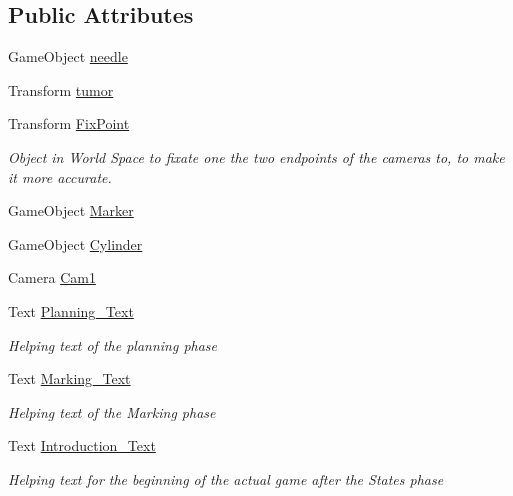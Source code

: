 \subsection*{Public Attributes}
\begin{DoxyCompactItemize}
\item 
Game\+Object \mbox{\hyperlink{class_states_by_switch_ac45169b7b1eeeeec3983d4c9109fb144}{needle}}
\item 
Transform \mbox{\hyperlink{class_states_by_switch_a22ee2b11d00f659a78da32cec049de22}{tumor}}
\item 
\mbox{\label{class_states_by_switch_a3f091084e5763ac5398db2e400b3e4db}} 
Transform \mbox{\hyperlink{class_states_by_switch_a3f091084e5763ac5398db2e400b3e4db}{Fix\+Point}}
\begin{DoxyCompactList}\small\item\em Object in World Space to fixate one the two endpoints of the cameras to, to make it more accurate. \end{DoxyCompactList}\item 
Game\+Object \mbox{\hyperlink{class_states_by_switch_a6350a4b4edd29eab4d2f1a00ce3890dd}{Marker}}
\item 
Game\+Object \mbox{\hyperlink{class_states_by_switch_a3b340adadbafc43f0679c3270fb84a07}{Cylinder}}
\item 
Camera \mbox{\hyperlink{class_states_by_switch_aa48de7de6af496872584ba82e82b20eb}{Cam1}}
\item 
Text \mbox{\hyperlink{class_states_by_switch_ac7c8a7d50ecf021994bc930d51cbccb2}{Planning\+\_\+\+Text}}
\begin{DoxyCompactList}\small\item\em Helping text of the planning phase \end{DoxyCompactList}\item 
Text \mbox{\hyperlink{class_states_by_switch_a010d70d2a27cdd261b50ad93dfa4c6d4}{Marking\+\_\+\+Text}}
\begin{DoxyCompactList}\small\item\em Helping text of the Marking phase \end{DoxyCompactList}\item 
Text \mbox{\hyperlink{class_states_by_switch_a46b23045719e76ba9455fa84d2c4613a}{Introduction\+\_\+\+Text}}
\begin{DoxyCompactList}\small\item\em Helping text for the beginning of the actual game after the States phase \end{DoxyCompactList}\item 

\end{DoxyCompactItemize}

